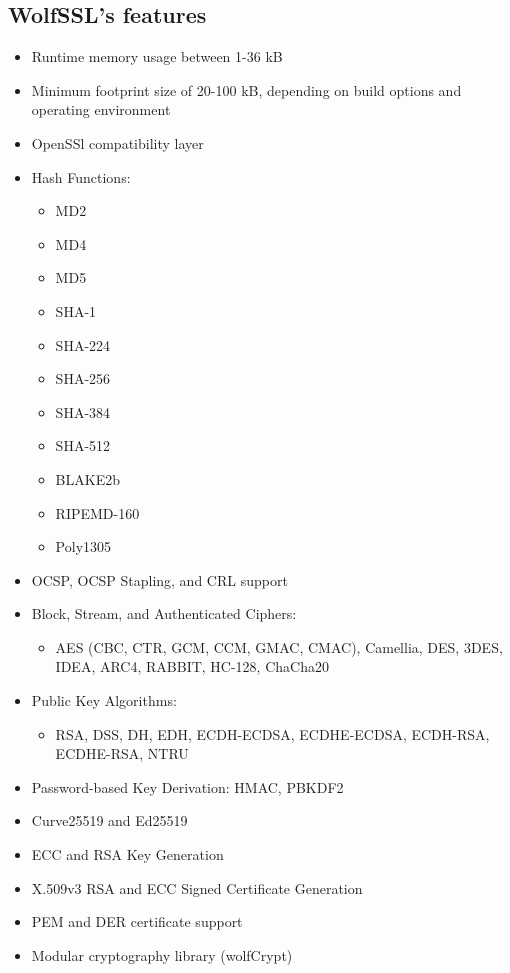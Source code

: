 \documentclass[a4paper,12pt]{article}
\begin{document}
\subsection{WolfSSL's features}
\begin{itemize}
\item Runtime memory usage between 1-36 kB
\item Minimum footprint size of 20-100 kB, depending on build options and operating environment
\item OpenSSl compatibility layer
\item Hash Functions: \begin{multicols}{3}\begin{itemize}
\item MD2
\item MD4
\item MD5
\item SHA-1
\item SHA-224
\item SHA-256
\item SHA-384
\item SHA-512
\item BLAKE2b
\item RIPEMD-160
\item Poly1305
\end{itemize}
\end{multicols}
\item OCSP, OCSP Stapling, and CRL support
\item Block, Stream, and Authenticated Ciphers:
\begin{itemize}
\item AES (CBC, CTR, GCM, CCM, GMAC, CMAC), Camellia, DES, 3DES, IDEA, ARC4, RABBIT, HC-128, ChaCha20
\end{itemize}
\item Public Key Algorithms:
\begin{itemize}
\item RSA, DSS, DH, EDH, ECDH-ECDSA, ECDHE-ECDSA, ECDH-RSA, ECDHE-RSA, NTRU
\end{itemize}
\item Password-based Key Derivation: HMAC, PBKDF2
\item Curve25519 and Ed25519
\item ECC and RSA Key Generation
\item X.509v3 RSA and ECC Signed Certificate Generation
\item PEM and DER certificate support
\item Modular cryptography library (wolfCrypt)

\end{itemize}
\end{document}
